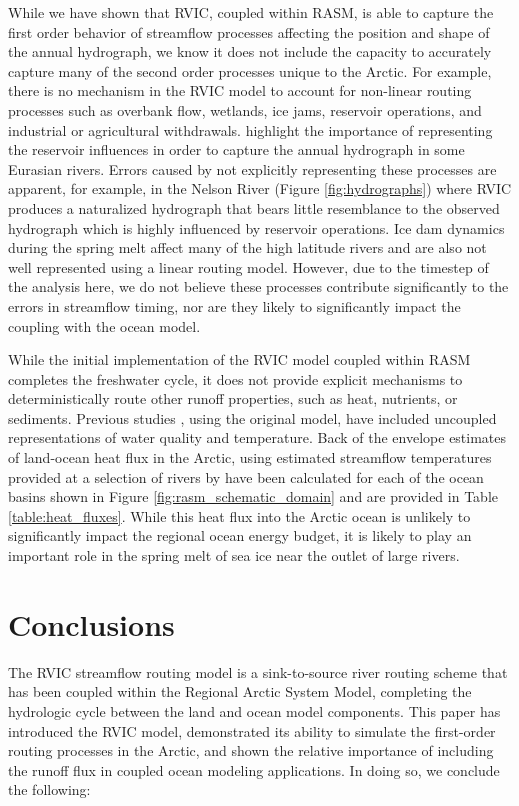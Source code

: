 \documentclass[jgrga, draft]{agutex}
\begin{document}
\begin{article}
\begin{itemize}[leftmargin=+.5in]
\begin{itemize}[leftmargin=+.5in]
While we have shown that RVIC, coupled within RASM, is able to capture the first order behavior of streamflow processes affecting the position and shape of the annual hydrograph, we know it does not include the capacity to accurately capture many of the second order processes unique to the Arctic.
For example, there is no mechanism in the RVIC model to account for non-linear routing processes such as overbank flow, wetlands, ice jams, reservoir operations, and industrial or agricultural withdrawals.
\citet{Adam_2007} highlight the importance of representing the reservoir influences in order to capture the annual hydrograph in some Eurasian rivers.
Errors caused by not explicitly representing these processes are apparent, for example, in the Nelson River (Figure \ref{fig:hydrographs}) where RVIC produces a naturalized hydrograph that bears little resemblance to the observed hydrograph which is highly influenced by reservoir operations.
Ice dam dynamics during the spring melt affect many of the high latitude rivers and are also not well represented using a linear routing model.
However, due to the timestep of the analysis here, we do not believe these processes contribute significantly to the errors in streamflow timing, nor are they likely to significantly impact the coupling with the ocean model.

While the initial implementation of the RVIC model coupled within RASM completes the freshwater cycle, it does not provide explicit mechanisms to deterministically route other runoff properties, such as heat, nutrients, or sediments.
Previous studies \citep[e.g.][]{vanVliet_2011,vanVliet_2012}, using the original \citet{Lohmann_1996} model, have included uncoupled representations of water quality and temperature.
Back of the envelope estimates of land-ocean heat flux in the Arctic, using estimated streamflow temperatures provided at a selection of rivers by \citet{Lammers_2007} have been calculated for each of the ocean basins shown in Figure \ref{fig:rasm_schematic_domain} and are provided in Table \ref{table:heat_fluxes}.
While this heat flux into the Arctic ocean is unlikely to significantly impact the regional ocean energy budget, it is likely to play an important role in the spring melt of sea ice near the outlet of large rivers.

\section{Conclusions}
\label{sec:conclusions}

The RVIC streamflow routing model is a sink-to-source river routing scheme that has been coupled within the Regional Arctic System Model, completing the hydrologic cycle between the land and ocean model components.
This paper has introduced the RVIC model, demonstrated its ability to simulate the first-order routing processes in the Arctic, and shown the relative importance of including the runoff flux in coupled ocean modeling applications.
In doing so, we conclude the following:


\end{itemize}
\end{itemize}
\end{article}
\end{document}
